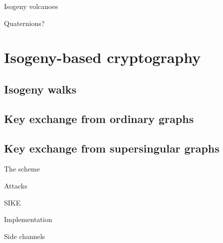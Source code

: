 \documentclass{beamer}
\begin{document}

\begin{frame}{Isogeny volcanoes}
  
\end{frame}


\begin{frame}{Quaternions?}
  
\end{frame}


\section{Isogeny-based cryptography}
\subsection{Isogeny walks}


\subsection{Key exchange from ordinary graphs}


\subsection{Key exchange from supersingular graphs}

\begin{frame}{The scheme}
  
\end{frame}


\begin{frame}{Attacks}
  
\end{frame}


\begin{frame}{SIKE}
  
\end{frame}


\begin{frame}{Implementation}
  
\end{frame}


\begin{frame}{Side channels}
  
\end{frame}
\end{document}
